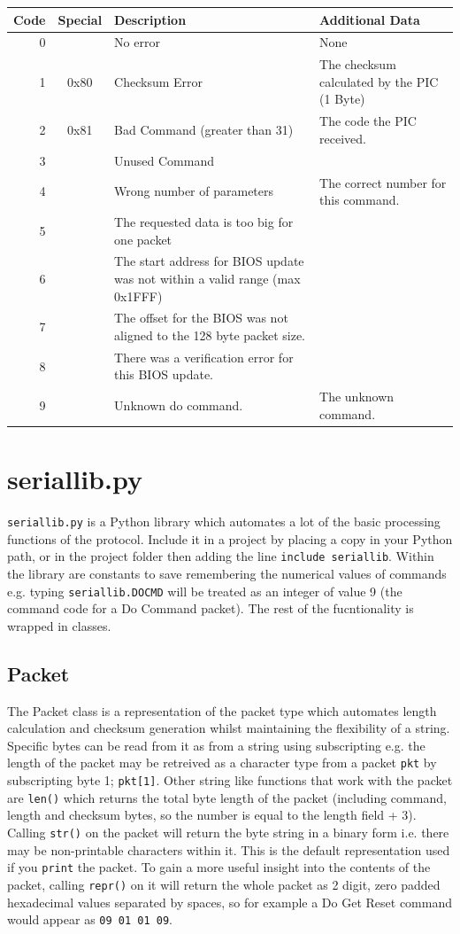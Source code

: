 \documentclass[a4paper,10pt]{book}
\begin{document}
\begin{tabular}{|r|c|p{3.7cm}|p{3.7cm}|}
\hline
\textbf{Code}&\textbf{Special}&\textbf{Description}&\textbf{Additional Data}\\
\hline
0&&No error&None\\
\hline
1&0x80&Checksum Error&The checksum calculated by the PIC (1 Byte)\\
\hline
2&0x81&Bad Command (greater than 31)&The code the PIC received.\\
\hline
3&&Unused Command&\\
\hline
4&&Wrong number of parameters&The correct number for this command.\\
\hline
5&&The requested data is too big for one packet&\\
\hline
6&&The start address for BIOS update was not within a valid range (max 0x1FFF)&\\
\hline
7&&The offset for the BIOS was not aligned to the 128 byte packet size.&\\
\hline
8&&There was a verification error for this BIOS update.&\\
\hline
9&&Unknown do command.&The unknown command.\\
\hline
\end{tabular}

\section{seriallib.py}
\texttt{seriallib.py} is a Python library which automates a lot of the basic processing functions of the protocol.  Include it in a project by placing a copy in your Python path, or in the project folder then adding the line \texttt{include seriallib}.  Within the library are constants to save remembering the numerical values of commands e.g. typing \texttt{seriallib.DOCMD} will be treated as an integer of value 9 (the command code for a Do Command packet).  The rest of the fucntionality is wrapped in classes.

\subsection{Packet}
The Packet class is a representation of the packet type which automates length calculation and checksum generation whilst maintaining the flexibility of a string.  Specific bytes can be read from it as from a string using subscripting e.g. the length of the packet may be retreived as a character type from a packet \texttt{pkt} by subscripting byte 1; \texttt{pkt[1]}.  Other string like functions that work with the packet are \texttt{len()} which returns the total byte length of the packet (including command, length and checksum bytes, so the number is equal to the length field + 3).  Calling \texttt{str()} on the packet will return the byte string in a binary form i.e. there may be non-printable characters within it.  This is the default representation used if you \texttt{print} the packet.  To gain a more useful insight into the contents of the packet, calling \texttt{repr()} on it will return the whole packet as 2 digit, zero padded hexadecimal values separated by spaces, so for example a Do Get Reset command would appear as \texttt{09 01 01 09}.
\end{document}
